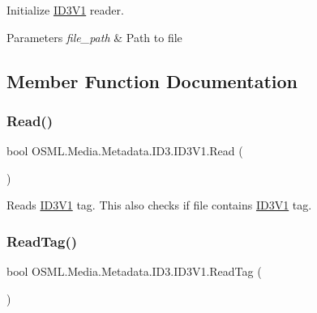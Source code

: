 Initialize \mbox{\hyperlink{classOSML_1_1Media_1_1Metadata_1_1ID3_1_1ID3V1}{I\+D3\+V1}} reader. 


\begin{DoxyParams}{Parameters}
{\em file\+\_\+path} & Path to file\\
\hline
\end{DoxyParams}


\subsection{Member Function Documentation}
\mbox{\label{classOSML_1_1Media_1_1Metadata_1_1ID3_1_1ID3V1_aca3a750df2cf6a6183a6a2aceb72ffc9}} 
\subsubsection{\texorpdfstring{Read()}{Read()}}
{\footnotesize\ttfamily bool O\+S\+M\+L.\+Media.\+Metadata.\+I\+D3.\+I\+D3\+V1.\+Read (\begin{DoxyParamCaption}{ }\end{DoxyParamCaption})\hspace{0.3cm}{\ttfamily [inline]}}



Reads \mbox{\hyperlink{classOSML_1_1Media_1_1Metadata_1_1ID3_1_1ID3V1}{I\+D3\+V1}} tag. This also checks if file contains \mbox{\hyperlink{classOSML_1_1Media_1_1Metadata_1_1ID3_1_1ID3V1}{I\+D3\+V1}} tag. 

\mbox{\label{classOSML_1_1Media_1_1Metadata_1_1ID3_1_1ID3V1_a70ec630b28cb47c0c231c9e99aa3ccd7}} 
\subsubsection{\texorpdfstring{ReadTag()}{ReadTag()}}
{\footnotesize\ttfamily bool O\+S\+M\+L.\+Media.\+Metadata.\+I\+D3.\+I\+D3\+V1.\+Read\+Tag (\begin{DoxyParamCaption}{ }\end{DoxyParamCaption})\hspace{0.3cm}{\ttfamily [inline]}}



